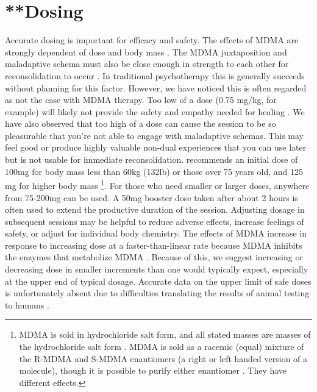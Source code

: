 \documentclass[12pt,letterpaper]{book}
\begin{document}
\section{**Dosing}
\label{sec:dosing}
Accurate dosing is important for efficacy and safety. The effects of MDMA are strongly dependent of dose and body mass \cite{studerusResponse}. The MDMA juxtaposition and maladaptive schema must also be close enough in strength to each other for reconsolidation to occur \cite{eckerUnlocking}. In traditional psychotherapy this is generally succeeds without planning for this factor. However, we have noticed this is often regarded as not the case with MDMA therapy. Too low of a dose (0.75 mg/kg, for example) will likely not provide the safety and empathy needed for healing \cite{bediMDMALowDose}. We have also observed that too high of a dose can cause the session to be so pleasurable that you're not able to engage with maladaptive schemas. This may feel good or produce highly valuable non-dual experiences that you can use later but is not usable for immediate reconsolidation. \textcite{liechtiInteractions} recommends an initial dose of 100mg for body mass less than 60kg (132lb) or those over 75 years old, and 125 mg for higher body mass \footnote{MDMA is sold in hydrochloride salt form, and all stated masses are masses of the hydrochloride salt form \cite{liechtiInteractions}. MDMA is sold as a racemic (equal) mixture of the R-MDMA and S-MDMA enantiomers (a right or left handed version of a molecule), though it is possible to purify either enantiomer \cite{straumann2024racemic}. They have different effects.}. For those who need smaller or larger doses, anywhere from 75-200mg can be used. A 50mg booster dose taken after about 2 hours is often used to extend the productive duration of the session. Adjusting dosage in subsequent sessions may be helpful to reduce adverse effects, increase feelings of safety, or adjust for individual body chemistry. The effects of MDMA increase in response to increasing dose at a faster-than-linear rate because MDMA inhibits the enzymes that metabolize MDMA \cite{de2000nonlinear}. Because of this, we suggest increasing or decreasing dose in smaller increments than one would typically expect, especially at the upper end of typical dosage. Accurate data on the upper limit of safe doses is unfortunately absent due to difficulties translating the results of animal testing to humans \cite{passieHistory}.
\end{document}
